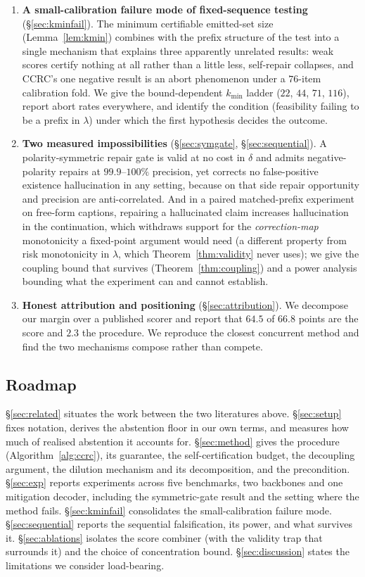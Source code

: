 \documentclass{article}
\theoremstyle{plain}
\theoremstyle{definition}
\theoremstyle{remark}
\begin{document}
\begin{enumerate}
\item \textbf{A small-calibration failure mode of fixed-sequence testing}
(\S\ref{sec:kminfail}). The minimum certifiable emitted-set size (Lemma~\ref{lem:kmin})
combines with the prefix structure of the test into a single mechanism that explains three
apparently unrelated results: weak scores certify nothing at all rather than a little less,
self-repair collapses, and CCRC's one negative result is an abort phenomenon under a $76$-item
calibration fold. We give the bound-dependent $k_{\min}$ ladder ($22$, $44$, $71$, $116$),
report abort rates everywhere, and identify the condition (feasibility failing to be a prefix
in $\lambda$) under which the first hypothesis decides the outcome.

\item \textbf{Two measured impossibilities} (\S\ref{sec:symgate}, \S\ref{sec:sequential}). A
polarity-symmetric repair gate is valid at no cost in $\delta$ and admits negative-polarity
repairs at $99.9$--$100\%$ precision, yet corrects no false-positive existence hallucination
in any setting, because on that side repair opportunity and precision are anti-correlated.
And in a paired matched-prefix experiment on free-form captions, repairing a hallucinated
claim increases hallucination in the continuation, which withdraws support for the
\emph{correction-map} monotonicity a fixed-point argument would need (a different property
from risk monotonicity in $\lambda$, which Theorem~\ref{thm:validity} never uses); we give
the coupling bound that survives (Theorem~\ref{thm:coupling}) and a power analysis bounding
what the experiment can and cannot establish.

\item \textbf{Honest attribution and positioning} (\S\ref{sec:attribution}). We decompose
our margin over a published scorer and report that $64.5$ of $66.8$ points are the score and
$2.3$ the procedure. We reproduce the closest concurrent method \citep{bcea} and find the two
mechanisms compose rather than compete.
\end{enumerate}

\subsection{Roadmap}
\S\ref{sec:related} situates the work between the two literatures above.
\S\ref{sec:setup} fixes notation, derives the abstention floor in our own terms, and measures
how much of realised abstention it accounts for. \S\ref{sec:method} gives the procedure
(Algorithm~\ref{alg:ccrc}), its guarantee, the self-certification budget, the decoupling
argument, the dilution mechanism and its decomposition, and the precondition.
\S\ref{sec:exp} reports experiments across five benchmarks, two backbones and one mitigation
decoder, including the symmetric-gate result and the setting where the method fails.
\S\ref{sec:kminfail} consolidates the small-calibration failure mode.
\S\ref{sec:sequential} reports the sequential falsification, its power, and what survives it.
\S\ref{sec:ablations} isolates the score combiner (with the validity trap that surrounds it) and the
choice of concentration bound. \S\ref{sec:discussion} states the limitations we consider
load-bearing.
\end{document}
